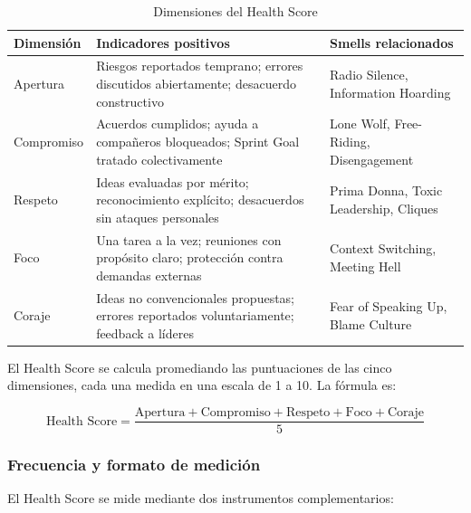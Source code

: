 \begin{table}[h]
    \centering
    \small
    \begin{tabularx}{\textwidth}{|l|X|X|}
        \hline
        \textbf{Dimensión} & \textbf{Indicadores positivos}                                                             & \textbf{Smells relacionados}           \\
        \hline
        Apertura           & Riesgos reportados temprano; errores discutidos abiertamente; desacuerdo constructivo      & Radio Silence, Information Hoarding    \\
        \hline
        Compromiso         & Acuerdos cumplidos; ayuda a compañeros bloqueados; Sprint Goal tratado colectivamente      & Lone Wolf, Free-Riding, Disengagement  \\
        \hline
        Respeto            & Ideas evaluadas por mérito; reconocimiento explícito; desacuerdos sin ataques personales   & Prima Donna, Toxic Leadership, Cliques \\
        \hline
        Foco               & Una tarea a la vez; reuniones con propósito claro; protección contra demandas externas     & Context Switching, Meeting Hell        \\
        \hline
        Coraje             & Ideas no convencionales propuestas; errores reportados voluntariamente; feedback a líderes & Fear of Speaking Up, Blame Culture     \\
        \hline
    \end{tabularx}
    \caption{Dimensiones del Health Score}
    \label{tab:dimensiones-health-score}
\end{table}

\FloatBarrier

El Health Score se calcula promediando las puntuaciones de las cinco dimensiones, cada una medida en una escala de 1 a 10. La fórmula es:

\begin{equation}
    \text{Health Score} = \frac{\text{Apertura} + \text{Compromiso} + \text{Respeto} + \text{Foco} + \text{Coraje}}{5}
\end{equation}

\subsubsection{Frecuencia y formato de medición}

El Health Score se mide mediante dos instrumentos complementarios:

